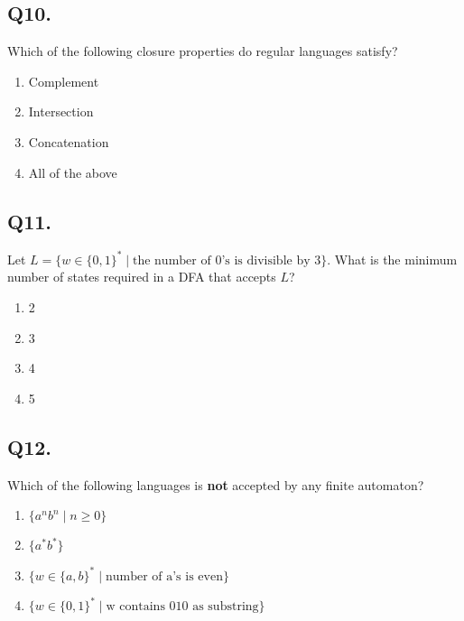 \vspace{1em}

\subsection*{Q10.}
Which of the following closure properties do regular languages satisfy?

\begin{enumerate}[label=(\alph*)]
    \item Complement  
    \item Intersection  
    \item Concatenation  
    \item All of the above  
\end{enumerate}

\vspace{1em}

\subsection*{Q11.}
Let $L = \{ w \in \{0,1\}^* \mid \text{the number of 0's is divisible by 3} \}$. What is the minimum number of states required in a DFA that accepts $L$?

\begin{enumerate}[label=(\alph*)]
    \item 2  
    \item 3  
    \item 4  
    \item 5  
\end{enumerate}

\vspace{1em}

\subsection*{Q12.}
Which of the following languages is \textbf{not} accepted by any finite automaton?

\begin{enumerate}[label=(\alph*)]
    \item $\{a^n b^n \mid n \geq 0 \}$  
    \item $\{a^* b^* \}$  
    \item $\{w \in \{a,b\}^* \mid \text{number of a’s is even} \}$  
    \item $\{w \in \{0,1\}^* \mid \text{w contains 010 as substring} \}$  
\end{enumerate}


